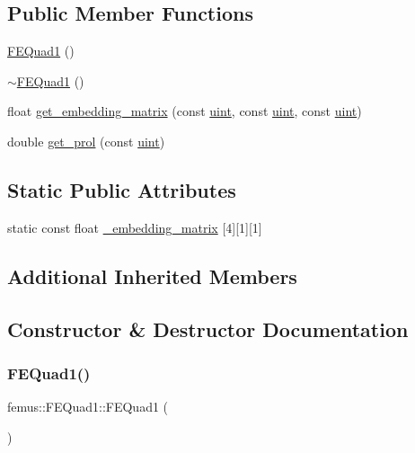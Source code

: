 \subsection*{Public Member Functions}
\begin{DoxyCompactItemize}
\item 
\mbox{\hyperlink{classfemus_1_1_f_e_quad1_aa4fe33187d9517d40b18a9d8af3183ad}{F\+E\+Quad1}} ()
\item 
\mbox{\hyperlink{classfemus_1_1_f_e_quad1_ad18511a0214fb48540a985da41b0aa0c}{$\sim$\+F\+E\+Quad1}} ()
\item 
float \mbox{\hyperlink{classfemus_1_1_f_e_quad1_a28f67697594e281a16e395df3ee3ae54}{get\+\_\+embedding\+\_\+matrix}} (const \mbox{\hyperlink{_typedefs_8hpp_a91ad9478d81a7aaf2593e8d9c3d06a14}{uint}}, const \mbox{\hyperlink{_typedefs_8hpp_a91ad9478d81a7aaf2593e8d9c3d06a14}{uint}}, const \mbox{\hyperlink{_typedefs_8hpp_a91ad9478d81a7aaf2593e8d9c3d06a14}{uint}})
\item 
double \mbox{\hyperlink{classfemus_1_1_f_e_quad1_af157e342c76e4f964bfe669501a1752d}{get\+\_\+prol}} (const \mbox{\hyperlink{_typedefs_8hpp_a91ad9478d81a7aaf2593e8d9c3d06a14}{uint}})
\end{DoxyCompactItemize}
\subsection*{Static Public Attributes}
\begin{DoxyCompactItemize}
\item 
static const float \mbox{\hyperlink{classfemus_1_1_f_e_quad1_ae517b96db0feaa741016d9361d807d2c}{\+\_\+embedding\+\_\+matrix}} \mbox{[}4\mbox{]}\mbox{[}1\mbox{]}\mbox{[}1\mbox{]}
\end{DoxyCompactItemize}
\subsection*{Additional Inherited Members}


\subsection{Constructor \& Destructor Documentation}
\mbox{\label{classfemus_1_1_f_e_quad1_aa4fe33187d9517d40b18a9d8af3183ad}} 
\subsubsection{\texorpdfstring{F\+E\+Quad1()}{FEQuad1()}}
{\footnotesize\ttfamily femus\+::\+F\+E\+Quad1\+::\+F\+E\+Quad1 (\begin{DoxyParamCaption}{ }\end{DoxyParamCaption})}

